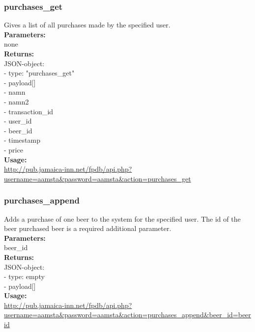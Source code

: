 \documentclass{article}
\begin{document}
\subsubsection{purchases\_get}
Gives a list of all purchases made by the specified user.\\
\textbf{Parameters:}\\
none\\
\textbf{Returns:}\\
JSON-object:\\
- type: "purchases\_get"\\
- payload[]\\
\indent  - namn\\
\indent  - namn2\\
\indent  - transaction\_id\\
\indent  - user\_id\\
\indent  - beer\_id\\
\indent  - timestamp\\
\indent  - price\\
\textbf{Usage:}\\
\url{http://pub.jamaica-inn.net/fpdb/api.php?username=aamsta\&password=aamsta\&action=purchases\_get}\\
    
\subsubsection{purchases\_append}
Adds a purchase of one beer to the system for the specified user. The id of the beer purchased beer is a required additional parameter.\\
\textbf{Parameters:}\\
beer\_id\\
\textbf{Returns:}\\
JSON-object:\\
- type: empty\\
- payload[]\\
\textbf{Usage:}\\
\url{http://pub.jamaica-inn.net/fpdb/api.php?username=aamsta\&password=aamsta\&action=purchases\_append\&beer\_id=beerid}\\
  
\end{document}
